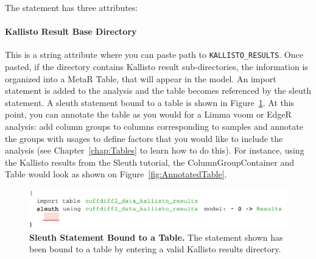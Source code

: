 The statement has three attributes:
\paragraph{Kallisto Result Base Directory}
This is a string attribute where you can paste path to \texttt{KALLISTO\_RESULTS}. Once pasted, if the directory contains Kallisto result sub-directories, the information is organized into a MetaR Table, that will appear in the model. An import statement is added to the analysis and the table becomes referenced by the sleuth statement. A sleuth statement bound to a table is shown in Figure~\ref{fig:KallistoBoundToTable}. At this point, you can annotate the table as you would for a Limma voom or EdgeR analysis: add column groups to columns corresponding to samples and annotate the groups with usages to define factors that you would like to include the analysis (see Chapter~\ref{chap:Tables} to learn how to do this).
For instance, using the Kallisto results from the Sleuth tutorial, the ColumnGroupContainer and Table would look as shown on Figure~\ref{fig:AnnotatedTable}.



\begin{figure}[h!tbp]
\centering
  \includegraphics[width=\figWidthWide]{figures/SleuthBoundToTable-1.pdf}
\caption[Sleuth Statement Bound to a Table.]{\textbf{Sleuth Statement Bound to a Table.} The statement shown has been bound to a table by entering a valid Kallisto results directory.}
\label{fig:KallistoBoundToTable}
\end{figure}


